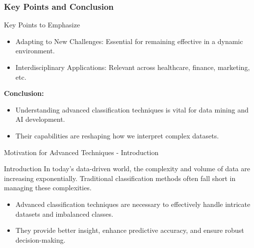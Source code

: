 \documentclass[aspectratio=169]{beamer}
\begin{document}
\begin{frame}[fragile]
    \frametitle{Key Points and Conclusion}
    \begin{block}{Key Points to Emphasize}
        \begin{itemize}
            \item Adapting to New Challenges: Essential for remaining effective in a dynamic environment.
            \item Interdisciplinary Applications: Relevant across healthcare, finance, marketing, etc.
        \end{itemize}
    \end{block}
    
    \textbf{Conclusion:}
    \begin{itemize}
        \item Understanding advanced classification techniques is vital for data mining and AI development.
        \item Their capabilities are reshaping how we interpret complex datasets.
    \end{itemize}
\end{frame}

\begin{frame}[fragile]{Motivation for Advanced Techniques - Introduction}
    \begin{block}{Introduction}
        In today's data-driven world, the complexity and volume of data are increasing exponentially. Traditional classification methods often fall short in managing these complexities. 
    \end{block}
    \begin{itemize}
        \item Advanced classification techniques are necessary to effectively handle intricate datasets and imbalanced classes.
        \item They provide better insight, enhance predictive accuracy, and ensure robust decision-making.
    \end{itemize}
\end{frame}
\end{document}
